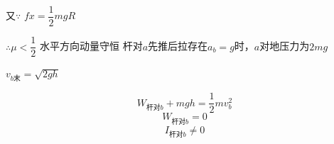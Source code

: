 又$\because$ $fx=\dfrac{1}{2}mgR$

$\therefore \mu<\dfrac{1}{2}$
水平方向动量守恒
杆对$a$先推后拉\quad 存在$a_b=g$时，$a$对地压力为$2mg$

$v_{b\text{末}}=\sqrt{2gh}$

\[
W_{\text{杆对}b}+mgh=\frac{1}{2}mv_b^2
\]
\[
W_{\text{杆对}b}=0
\]
\[
I_{\text{杆对}b}\neq 0
\]
